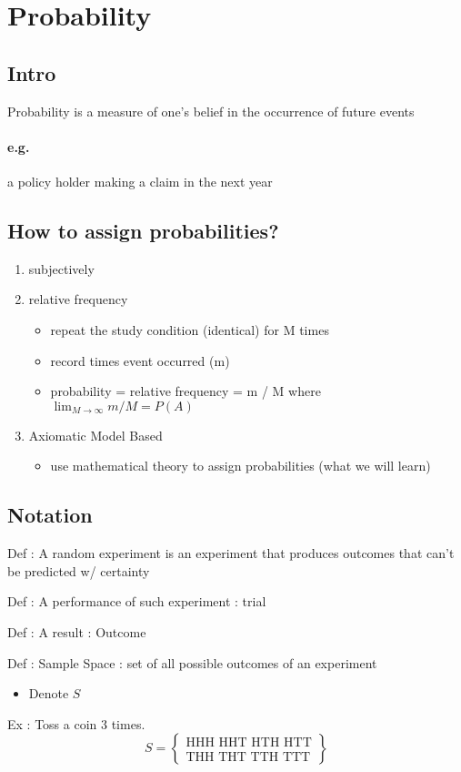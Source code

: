 \chapter*{Probability}
\section*{Intro}
Probability is a measure of one's belief in the occurrence of future events
\subsubsection*{e.g.}
a policy holder making a claim in the next year
\section*{How to assign probabilities?}
\begin{enumerate}
    \item subjectively
    \item relative frequency
	\begin{itemize}
	    \item repeat the study condition (identical) for M times
	    \item record times event occurred (m)
	    \item probability = relative frequency = m / M where $\lim_{M \to \infty} m / M = P(A)$
	\end{itemize}
    \item Axiomatic Model Based
	\begin{itemize}
	    \item use mathematical theory to assign probabilities (what we will learn)
	\end{itemize}
\end{enumerate}
\section*{Notation}

Def : A random experiment is an experiment that produces outcomes that can't be predicted w/ certainty

Def : A performance of such experiment : trial

Def : A result : Outcome

Def : Sample Space : set of all possible outcomes of an experiment
\begin{itemize}
    \item Denote $S$
\end{itemize}
Ex : Toss a coin 3 times.
\begin{equation*}
    S = 
    \begin{Bmatrix} 
	\text{HHH HHT HTH HTT} \\
	\text{THH THT TTH TTT}
    \end{Bmatrix}
\end{equation*}

